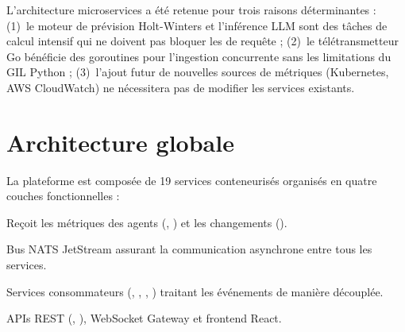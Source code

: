 L'architecture microservices a été retenue pour trois raisons déterminantes :
(1)~le moteur de prévision Holt-Winters et l'inférence LLM sont des tâches
de calcul intensif qui ne doivent pas bloquer les \api{} de requête ;
(2)~le télétransmetteur Go bénéficie des goroutines pour l'ingestion
concurrente sans les limitations du GIL Python ;
(3)~l'ajout futur de nouvelles sources de métriques (Kubernetes, AWS CloudWatch)
ne nécessitera pas de modifier les services existants.

\section{Architecture globale}

La plateforme \caimp{} est composée de 19 services conteneurisés organisés en
quatre couches fonctionnelles :

\begin{description}[leftmargin=2cm]
  \item[Couche d'ingestion] Reçoit les métriques des agents (,
    ) et les changements ().
  \item[Couche d'événements] Bus NATS JetStream assurant la communication
    asynchrone entre tous les services.
  \item[Couche de traitement] Services consommateurs (,
    , ,
    ) traitant les événements de manière découplée.
  \item[Couche de présentation] APIs REST (,
    ), WebSocket Gateway et frontend React.
\end{description}

